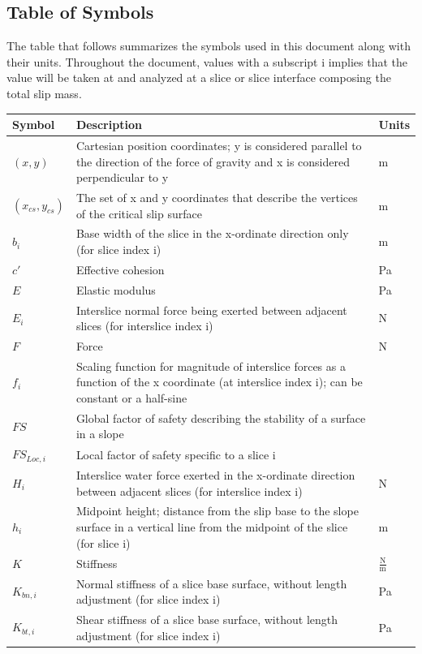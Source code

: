 \documentclass[12pt]{article}
\begin{document}
\subsection{Table of Symbols}
\label{Sec:ToS}
The table that follows summarizes the symbols used in this document along with their units. Throughout the document, values with a subscript i implies that the value will be taken at and analyzed at a slice or slice interface composing the total slip mass.
\begin{longtable*}{l l l}
\toprule
Symbol & Description & Units
\\
\midrule
$(x,y)$ & Cartesian position coordinates; y is considered parallel to the direction of the force of gravity and x is considered perpendicular to y & m
\\
$({x_{cs}},{y_{cs}})$ & The set of x and y coordinates that describe the vertices of the critical slip surface & m
\\
$b_{i}$ & Base width of the slice in the x-ordinate direction only (for slice index i) & m
\\
$c'$ & Effective cohesion & Pa
\\
$E$ & Elastic modulus & Pa
\\
$E_{i}$ & Interslice normal force being exerted between adjacent slices (for interslice index i) & N
\\
$F$ & Force & N
\\
$f_{i}$ & Scaling function for magnitude of interslice forces as a function of the x coordinate (at interslice index i); can be constant or a half-sine & 
\\
$FS$ & Global factor of safety describing the stability of a surface in a slope & 
\\
$FS_{Loc,i}$ & Local factor of safety specific to a slice i & 
\\
$H_{i}$ & Interslice water force exerted in the x-ordinate direction between adjacent slices (for interslice index i) & N
\\
$h_{i}$ & Midpoint height; distance from the slip base to the slope surface in a vertical line from the midpoint of the slice (for slice i) & m
\\
$K$ & Stiffness & $\frac{\text{N}}{\text{m}}$
\\
$K_{bn,i}$ & Normal stiffness of a slice base surface, without length adjustment (for slice index i) & Pa
\\
$K_{bt,i}$ & Shear stiffness of a slice base surface, without length adjustment (for slice index i) & Pa
\\

\end{longtable*}
\end{document}
